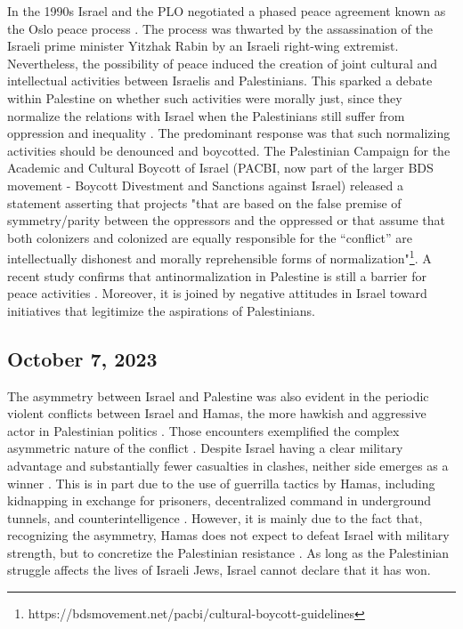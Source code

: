 \documentclass[dissertation,math,vertlayout,pdfa,colorlinks,nologo]{aaltoseries}
\begin{document}
In the 1990s Israel and the PLO negotiated a phased peace agreement known as the Oslo peace process \cite{bickertonOsloPeaceProcess2022}. The process was thwarted by the assassination of the Israeli prime minister Yitzhak Rabin by an Israeli right-wing extremist. Nevertheless, the possibility of peace induced the creation of joint cultural and intellectual activities between Israelis and Palestinians. This sparked a debate within Palestine on whether such activities were morally just, since they normalize the relations with Israel when the Palestinians still suffer from oppression and inequality \cite{miariAttitudesPalestiniansNormalization1999}. The predominant response was that such normalizing activities should be denounced and boycotted. The Palestinian Campaign for the Academic and Cultural Boycott of Israel (PACBI, now part of the larger BDS movement - Boycott Divestment and Sanctions against Israel) released a statement asserting that projects "that are based on the false premise of symmetry/parity between the oppressors and the oppressed or that assume that both colonizers and colonized are equally responsible for the “conflict” are intellectually dishonest and morally reprehensible forms of normalization"\footnote{https://bdsmovement.net/pacbi/cultural-boycott-guidelines}. A recent study confirms that antinormalization in Palestine is still a barrier for peace activities \cite{hassounaSpacesDialogueSegregated2016}. Moreover, it is joined by negative attitudes in Israel toward initiatives that legitimize the aspirations of Palestinians.

\subsection{October 7, 2023}
The asymmetry between Israel and Palestine was also evident in the periodic violent conflicts between Israel and Hamas, the more hawkish and aggressive actor in Palestinian politics \cite{pearlmanPalestinianNationalism2022}. Those encounters exemplified the complex asymmetric nature of the conflict \cite{rossBarriersAgreementAsymmetric2014}. Despite Israel having a clear military advantage and substantially fewer casualties in clashes, neither side emerges as a winner \cite{hitmanWinnerDoesNot2023}. This is in part due to the use of guerrilla tactics by Hamas, including kidnapping in exchange for prisoners, decentralized command in underground tunnels, and counterintelligence \cite{flamerAsymmetricBattleWits2025}. However, it is mainly due to the fact that, recognizing the asymmetry, Hamas does not expect to defeat Israel with military strength, but to concretize the Palestinian resistance \cite{hitmanWinnerDoesNot2023}. As long as the Palestinian struggle affects the lives of Israeli Jews, Israel cannot declare that it has won.
\end{document}

